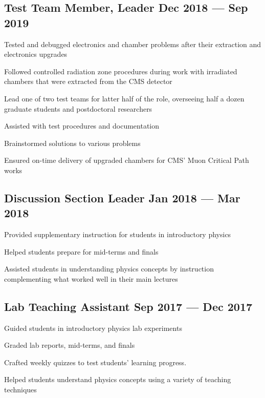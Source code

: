 \documentclass[letter,10pt]{article}
\begin{document}
\subsection{{Test Team Member, Leader \hfill Dec 2018 --- Sep 2019}}
\begin{zitemize}
\item Tested and debugged electronics and chamber problems after their extraction and electronics upgrades
\item Followed controlled radiation zone procedures during work with irradiated chambers that were extracted from the CMS detector
\item Lead one of two test teams for latter half of the role, overseeing half a dozen graduate students and postdoctoral researchers
\item Assisted with test procedures and documentation
\item Brainstormed solutions to various problems
\item Ensured on-time delivery of upgraded chambers for CMS' Muon Critical Path works
\end{zitemize}

\subsection{{Discussion Section Leader \hfill Jan 2018 --- Mar 2018}}
\begin{zitemize}
\item Provided supplementary instruction for students in introductory physics
\item Helped students prepare for mid-terms and finals
\item Assisted students in understanding physics concepts by instruction complementing what worked well in their main lectures
\end{zitemize}

\subsection{{Lab Teaching Assistant \hfill Sep 2017 --- Dec 2017}}
\begin{zitemize}
\item Guided students in introductory physics lab experiments
\item Graded lab reports, mid-terms, and finals
\item Crafted weekly quizzes to test students' learning progress.
\item Helped students understand physics concepts using a variety of teaching techniques
\end{zitemize}
\end{document}
